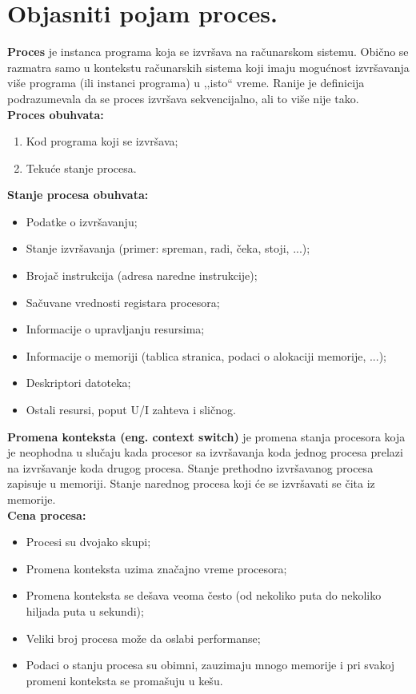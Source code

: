 \documentclass[a4paper]{article}
\begin{document}
\section{Objasniti pojam proces.}
  \textbf{Proces} je instanca programa koja se izvršava na računarskom sistemu. 
  Obično se razmatra samo u kontekstu računarskih sistema koji imaju mogućnost 
  izvršavanja više programa (ili instanci programa) u ,,isto`` vreme. Ranije je definicija 
  podrazumevala da se proces izvršava sekvencijalno, ali to više nije tako.\\
  \textbf{Proces obuhvata:}
  \begin{enumerate}
    \item Kod programa koji se izvršava;
    \item Tekuće stanje procesa.
  \end{enumerate}
  \textbf{Stanje procesa obuhvata:}
  \begin{itemize}
    \item Podatke o izvršavanju;
    \item Stanje izvršavanja (primer: spreman, radi, čeka, stoji, ...);
    \item Brojač instrukcija (adresa naredne instrukcije);
    \item Sačuvane vrednosti registara procesora;
    \item Informacije o upravljanju resursima;
    \item Informacije o memoriji (tablica stranica, podaci o alokaciji memorije, ...);
    \item Deskriptori datoteka;
    \item Ostali resursi, poput U/I zahteva i sličnog.
  \end{itemize}
  
  \textbf{Promena konteksta (eng. context switch)} je promena stanja procesora koja je 
  neophodna u slučaju kada procesor sa izvršavanja koda jednog procesa prelazi 
  na izvršavanje koda drugog procesa. Stanje prethodno izvršavanog procesa zapisuje u memoriji. 
  Stanje narednog procesa koji će se izvršavati se čita iz memorije.\\
  \textbf{Cena procesa:}
  \begin{itemize}
    \item Procesi su dvojako skupi;
    \item Promena konteksta uzima značajno vreme procesora;
    \item Promena konteksta se dešava veoma često (od nekoliko puta do nekoliko hiljada 
          puta u sekundi);
    \item Veliki broj procesa može da oslabi performanse;
    \item Podaci o stanju procesa su obimni, zauzimaju mnogo memorije i pri svakoj promeni konteksta 
          se promašuju u kešu.
  \end{itemize}
\end{document}
